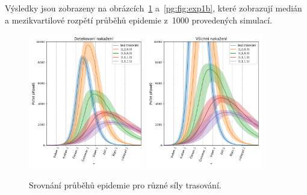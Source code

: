 Výsledky jsou zobrazeny na obrázcích~\ref{pg:fig:exp1a}
a~\ref{pg:fig:exp1b}, které zobrazují medián a mezikvartilové rozpětí
průběhů epidemie z~1000 provedených simulací.



\begin{figure}[ht]
  \centering
  \includegraphics[width=0.45\textwidth]{pic/history_second_exp_detected_iqr.png}
  \includegraphics[width=0.45\textwidth]{pic/history_second_exp_all_iqr.png}
  \caption{Srovnání průběhů epidemie pro různé síly trasování.}
  \label{pg:fig:exp1a}
\end{figure}

